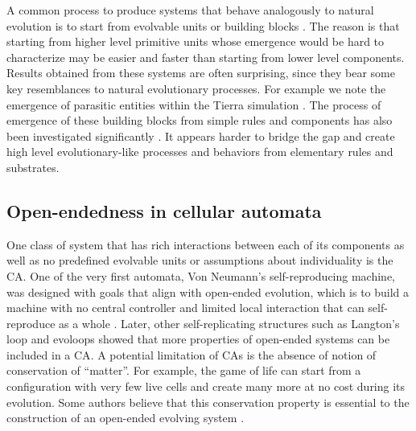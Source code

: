 A common process to produce systems that behave analogously to natural evolution
is to start from evolvable units or building blocks
\parencite{srayApproachSynthesisLife1991, simsEvolvingVirtualCreatures1994,
  ofriaAvidaSoftwarePlatform2004, yaegerComputationalGeneticsPhysiology1994,
  channonImprovingStillPassing2003, spectorDivisionBlocksOpenended2007,
  sorosIdentifyingNecessaryConditions2014}. The reason is that starting from
higher level primitive units whose emergence would be hard to characterize may
be easier and faster than starting from lower level components. Results obtained
from these systems are often surprising, since they bear some key resemblances
to natural evolutionary processes. For example we note the emergence of
parasitic entities within the Tierra simulation
\parencite{srayApproachSynthesisLife1991}. The process of emergence of these
building blocks from simple rules and components has also been investigated
significantly \parencite{bagleySpontaneousEmergenceMetabolism1991,
  huttonEvolvableSelfReproducingCells2007, flammEvolutionMetabolicNetworks2010,
  sayamaSeekingOpenendedEvolution2011}. It appears harder to bridge the gap and
create high level evolutionary-like processes and behaviors from elementary
rules and substrates.

\subsection{Open-endedness in cellular automata}
One class of system that has rich interactions between each of its components as
well as no predefined evolvable units or assumptions about individuality is the
\ac{CA}. One of the very first automata, Von Neumann's self-reproducing machine,
was designed with goals that align with open-ended evolution, which is to build
a machine with no central controller and limited local interaction that can
self-reproduce as a whole
\parencite{vonneumannTheorySelfreproducingAutomata1966,
  pesaventoImplementationNeumannSelfReproducing1995}. Later, other
self-replicating structures such as Langton's loop
\parencite{langtonSelfreproductionCellularAutomata1984} and evoloops
\parencite{sayamaNewStructurallyDissolvable1999,
  salzbergComplexGeneticEvolution2004} showed that more properties of open-ended
systems can be included in a \ac{CA}. A potential limitation of \acp{CA} is the
absence of notion of conservation of ``matter''. For example, the game of life
can start from a configuration with very few live cells and create many more at
no cost during its evolution. Some authors believe that this conservation
property is essential to the construction of an open-ended evolving system
\parencite{taylorChapterCreativityEvolution2002}.

